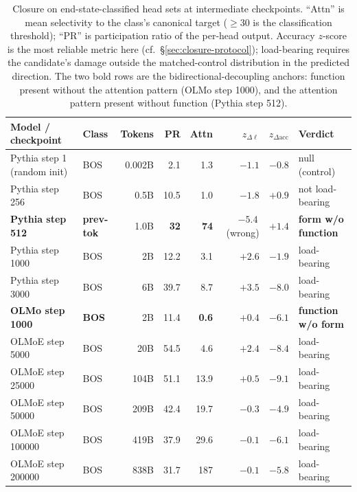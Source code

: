 \documentclass[11pt]{article}
\begin{document}
\begin{table}[H]
\centering
\footnotesize
\setlength{\tabcolsep}{4.5pt}
\begin{tabular}{@{}llrrrrrl@{}}
\toprule
Model / checkpoint & Class & Tokens & PR & Attn & $z_{\Delta\ell}$ & $z_{\Delta\text{acc}}$ & Verdict \\
\midrule
Pythia step 1 (random init) & BOS & 0.002B & 2.1 & 1.3 & $-1.1$ & $-0.8$ & null (control) \\
Pythia step 256 & BOS & 0.5B & 10.5 & 1.0 & $-1.8$ & $+0.9$ & not load-bearing \\
\textbf{Pythia step 512} & \textbf{prev-tok} & 1.0B & \textbf{32} & \textbf{74} & $\mathbf{-5.4}$\,(wrong) & $+1.4$ & \textbf{form w/o function} \\
Pythia step 1000 & BOS & 2B & 12.2 & 3.1 & $+2.6$ & $-1.9$ & load-bearing \\
Pythia step 3000 & BOS & 6B & 39.7 & 8.7 & $+3.5$ & $-8.0$ & load-bearing \\
\textbf{OLMo step 1000} & \textbf{BOS} & 2B & 11.4 & \textbf{0.6} & $+0.4$ & $\mathbf{-6.1}$ & \textbf{function w/o form} \\
OLMoE step 5000 & BOS & 20B & 54.5 & 4.6 & $+2.4$ & $-8.4$ & load-bearing \\
OLMoE step 25000 & BOS & 104B & 51.1 & 13.9 & $+0.5$ & $-9.1$ & load-bearing \\
OLMoE step 50000 & BOS & 209B & 42.4 & 19.7 & $-0.3$ & $-4.9$ & load-bearing \\
OLMoE step 100000 & BOS & 419B & 37.9 & 29.6 & $-0.1$ & $-6.1$ & load-bearing \\
OLMoE step 200000 & BOS & 838B & 31.7 & 187 & $-0.1$ & $-5.8$ & load-bearing \\
\bottomrule
\end{tabular}
\caption{Closure on end-state-classified head sets at intermediate
checkpoints. ``Attn'' is mean selectivity to the class's canonical target
($\geq 30$ is the classification threshold); ``PR'' is participation ratio
of the per-head output. Accuracy $z$-score is the most reliable metric
here (cf.\ \S\ref{sec:closure-protocol}); load-bearing requires the
candidate's damage outside the matched-control distribution in the
predicted direction. The two bold rows are the bidirectional-decoupling
anchors: function present without the attention pattern (OLMo step 1000),
and the attention pattern present without function (Pythia step 512).}
\label{tab:dev-closure}
\end{table}
\end{document}
